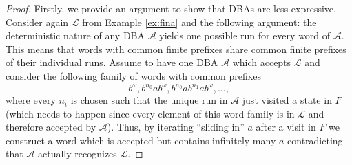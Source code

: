 \begin{proof}
  Firstly, we provide an argument to show that \acp{DBA} are less expressive.
  Consider again $\mathcal{L}$ from Example \ref{ex:fina} and the following
  argument: the deterministic nature of any \ac{DBA} $\mathcal{A}$ yields one
  possible run for every word of $\mathcal{A}$. This means that words with
  common finite prefixes share common finite prefixes of their individual runs.
  Assume to have one \ac{DBA} $\mathcal{A}$ which accepts $\mathcal{L}$ and 
  consider the following family of words with common prefixes
  \begin{equation*}
    b^{\omega}, b^{n_{0}}ab^{\omega}, b^{n_{0}}ab^{n_{1}}ab^{\omega}, \dots,
  \end{equation*}
  where every $n_{i}$ is chosen such that the unique run in $\mathcal{A}$
  just visited a state in $F$ (which needs to happen since every element of
  this word-family is in $\mathcal{L}$ and therefore accepted by $\mathcal{A}$).
  Thus, by iterating \enquote{sliding in} $a$ after a visit in $F$ we construct 
  a word which is accepted but contains infinitely many $a$ contradicting that
  $\mathcal{A}$ actually recognizes $\mathcal{L}$.


\end{proof}
